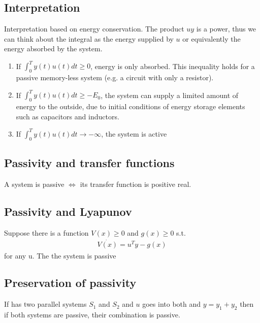 \subsection{Interpretation}
Interpretation based on energy conservation. The product $uy$ is a power, thus we can think about the integral as the energy supplied by $u$ or equivalently the energy absorbed by the system.
\begin{enumerate}
    \item If $\int_0^Ty(t)u(t)dt\geq0$, energy is only absorbed. This inequality holds for a passive memory-less system (e.g. a circuit with only a resistor).
    \item If $\int_0^Ty(t)u(t)dt\geq-E_0$, the system can supply a limited amount of energy to the outside, due to initial conditions of energy storage elements such as capacitors and inductors.
    \item If $\int_0^Ty(t)u(t)dt\rightarrow-\infty$, the system is active
\end{enumerate}

\subsection{Passivity and transfer functions}
A system is passive $\iff$ its transfer function is positive real.

\subsection{Passivity and Lyapunov}
Suppose there is a function $V(x)\geq0$ and $g(x)\geq0$ s.t. 
\begin{align}
    \dot{V(x)}=u^Ty-g(x)
\end{align}
for any u. The  the system is passive

\subsection{Preservation of passivity}
If has two parallel systems $S_1$ and $S_2$ and $u$ goes into both and $y=y_1+y_2$ then if both systems are passive, their combination is passive.

